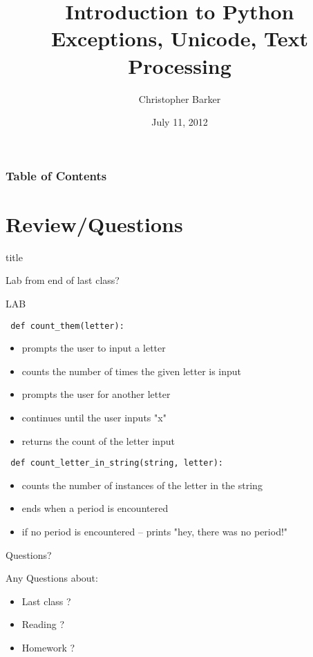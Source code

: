 \documentclass{beamer}
\title[Intro to Python: Week 2]{Introduction  to Python\\ Exceptions, Unicode, Text Processing}
\author{Christopher Barker}
\institute{UW Continuing Education / Isilon}
\date{July 11, 2012}
\begin{document}
\begin{frame}
  \titlepage
\end{frame}

\begin{frame}
\frametitle{Table of Contents}
  \tableofcontents
\end{frame}

\section{Review/Questions}


\begin{frame}{title}

{\Large Lab from end of last class?  }

\end{frame}


\begin{frame}[fragile]{LAB}

\verb| def count_them(letter): |
\begin{itemize}
  \item prompts the user to input a letter
  \item counts the number of times the given letter is input
  \item prompts the user for another letter
  \item continues until the user inputs "x"
  \item returns the count of the letter input
\end{itemize}

\verb| def count_letter_in_string(string, letter): |
\begin{itemize}
  \item counts the number of instances of the letter in the string
  \item ends when a period is encountered
  \item if no period is encountered -- prints "hey, there was no period!"
\end{itemize}
\end{frame}


\begin{frame}{Questions?}

{\Large Any Questions about:
\begin{itemize}
  \item Last class ?
  \item Reading ?
  \item Homework ?
\end{itemize}
}
\end{frame}
\end{document}

